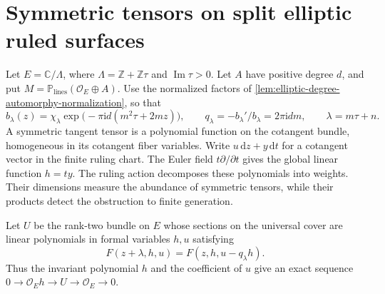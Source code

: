 \section{Symmetric tensors on split elliptic ruled surfaces}
\label{sec:split-elliptic-symmetric-tensors}

Let $E=\mathbb C/\Lambda$, where $\Lambda=\mathbb Z+\mathbb Z\tau$ and $\operatorname{Im}\tau>0$. Let $A$ have positive degree $d$, and put $M=\mathbb P_{\mathrm{lines}}(\mathcal O_E\oplus A)$. Use the normalized factors of \cref{lem:elliptic-degree-automorphy-normalization}, so that
\[
 b_\lambda(z)=\chi_\lambda
       \exp\bigl(-\pi\mathrm{i}d(m^2\tau+2mz)\bigr),
 \qquad q_\lambda=-b_\lambda'/b_\lambda=2\pi\mathrm{i}dm,
 \qquad \lambda=m\tau+n.
\]
A symmetric tangent tensor is a polynomial function on the cotangent bundle, homogeneous in its cotangent fiber variables. Write $u\,\mathrm{d}z+y\,\mathrm{d}t$ for a cotangent vector in the finite ruling chart. The Euler field $t\partial/\partial t$ gives the global linear function $h=ty$. The ruling action decomposes these polynomials into weights. Their dimensions measure the abundance of symmetric tensors, while their products detect the obstruction to finite generation.

Let $U$ be the rank-two bundle on $E$ whose sections on the universal cover are linear polynomials in formal variables $h,u$ satisfying
\[
 F(z+\lambda,h,u)=F(z,h,u-q_\lambda h).
\]
Thus the invariant polynomial $h$ and the coefficient of $u$ give an exact sequence $0\to\mathcal O_Eh\to U\to\mathcal O_E\to0$.

